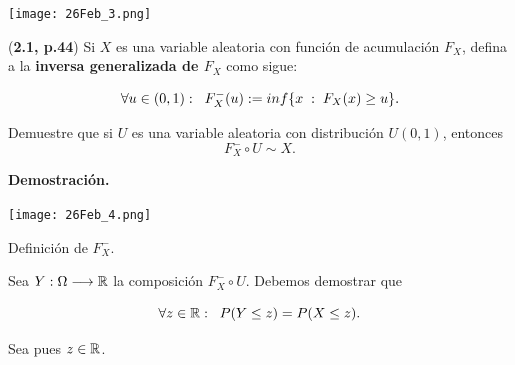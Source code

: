 \begin{center}
\begin{marginfigure}
  \centering
  \texttt{[image: 26Feb\_3.png]}
\end{marginfigure}
\end{center}
\begin{ejercicio}
\label{ejerc: 2.1}
(\textbf{2.1, p.44})
Si $X$ es una variable aleatoria con función de
acumulación $F_{X}$, defina a la \textbf{inversa generalizada
de $F_{X}$} como sigue:

\begin{equation}
\forall u \in (0,1): \hspace*{0.2cm}
F_{X}^{-}(u):= inf\{x \hspace{0.1cm} : \hspace*{0.1cm} F_{X}(x) \geq u \}.
\end{equation}

Demuestre que si $U$ es una variable aleatoria con
distribución $U(0,1)$, entonces 
\[
F_{X}^{-} \circ U \sim X.
\]
\end{ejercicio}
\noindent
\textbf{Demostración.}

\begin{center}
\begin{marginfigure}
  \centering
  \texttt{[image: 26Feb\_4.png]}
  \caption{Definición de $F^{-}_{X}$.}
\end{marginfigure}
\end{center}


Sea $Y: \Omega \longrightarrow \mathbb{R}$ la composición
$F^{-}_{X} \circ U$. Debemos demostrar que

\begin{equation*}
\forall z \in \mathbb{R}: \hspace*{0.2cm}
P(Y \leq z) = P(X \leq z).
\end{equation*}


Sea pues $z \in \mathbb{R}$.

